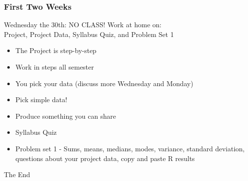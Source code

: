 \documentclass{beamer}
\begin{document}
\begin{frame}
\frametitle{First Two Weeks}
{\Large Wednesday the 30th: NO CLASS! Work at home on:}\\
{\Large Project, Project Data, Syllabus Quiz, and Problem Set 1}
\begin{itemize}
\item The Project is step-by-step
\item Work in steps all semester
\item You pick your data (discuss more Wednesday and Monday)
\item Pick simple data!
\item Produce something you can share
\item Syllabus Quiz
\item Problem set 1 - Sums, means, medians, modes, variance, standard deviation, questions about your project data, copy and paste R results
\end{itemize}
\end{frame}














\begin{frame}

\Huge{\centerline{The End}}

\end{frame}



\end{document}
